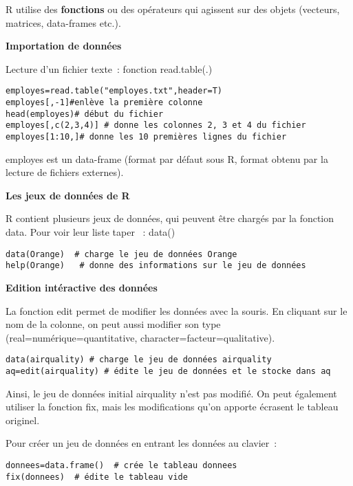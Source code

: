 \documentclass[11pt]{article}
\begin{document}
{R utilise des {\bf fonctions} ou des opérateurs qui agissent sur des objets (vecteurs, matrices, data-frames etc.).

\bigskip

{\bf Importation  de données}

Lecture d'un fichier texte~: fonction read.table(.)

\begin{verbatim}
employes=read.table("employes.txt",header=T)
employes[,-1]#enlève la première colonne
head(employes)# début du fichier
employes[,c(2,3,4)] # donne les colonnes 2, 3 et 4 du fichier
employes[1:10,]# donne les 10 premières lignes du fichier
\end{verbatim}

employes est un data-frame (format par défaut sous R,
format obtenu par la lecture de fichiers externes).
\bigskip

{\bf Les jeux de données de R}

R contient plusieurs jeux de données, qui peuvent être chargés par la fonction data.
Pour voir leur liste taper ~: data()

\bigskip
\begin{verbatim}
data(Orange)  # charge le jeu de données Orange
help(Orange)   # donne des informations sur le jeu de données
\end{verbatim}

\bigskip
{\bf Edition intéractive des données}

La fonction edit permet de modifier les données avec la souris. En cliquant sur le nom de la colonne, on peut aussi modifier son type
(real=numérique=quantitative, character=facteur=qualitative).


\begin{verbatim}
data(airquality) # charge le jeu de données airquality
aq=edit(airquality) # édite le jeu de données et le stocke dans aq
\end{verbatim}


Ainsi, le jeu de données initial airquality n'est pas modifié. On peut également utiliser la fonction fix, mais les modifications  qu'on apporte
écrasent le tableau originel.

Pour créer un jeu de données en entrant les données au clavier~:

\begin{verbatim}
donnees=data.frame()  # crée le tableau donnees
fix(donnees)  # édite le tableau vide
\end{verbatim}


}
\end{document}
